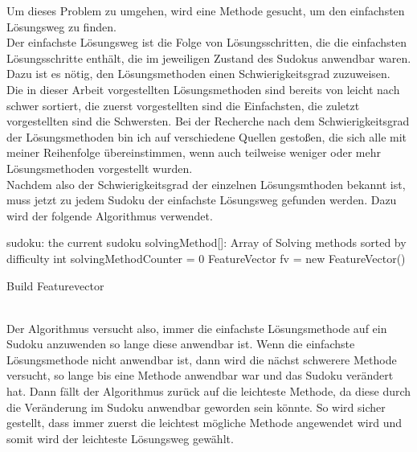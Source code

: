 Um dieses Problem zu umgehen, wird eine Methode gesucht, um den einfachsten Lösungsweg zu finden.\\
Der einfachste Lösungsweg ist die Folge von Lösungsschritten, die die einfachsten Lösungsschritte enthält, die im jeweiligen Zustand des Sudokus anwendbar waren. Dazu ist es nötig, den Lösungsmethoden einen Schwierigkeitsgrad zuzuweisen. \\
Die in dieser Arbeit vorgestellten Lösungsmethoden sind bereits von leicht nach schwer sortiert, die zuerst vorgestellten sind die Einfachsten, die zuletzt vorgestellten sind die Schwersten. Bei der Recherche nach dem Schwierigkeitsgrad der Lösungsmethoden bin ich auf verschiedene Quellen gestoßen, die sich alle mit meiner Reihenfolge übereinstimmen, wenn auch teilweise weniger oder mehr Lösungsmethoden vorgestellt wurden.\\
Nachdem also der Schwierigkeitsgrad der einzelnen Lösungsmthoden bekannt ist, muss jetzt zu jedem Sudoku der einfachste Lösungsweg gefunden werden. Dazu wird der folgende Algorithmus verwendet.\\

\begin{algorithm}[H]
 sudoku: the current sudoku\;
 solvingMethod[]: Array of Solving methods sorted by difficulty\;
 int solvingMethodCounter = 0\;
 FeatureVector fv = new FeatureVector()\;
 \caption{Build Featurevector}
\end{algorithm}
\mbox{} \\
Der Algorithmus versucht also, immer die einfachste Lösungsmethode auf ein Sudoku anzuwenden so lange diese anwendbar ist. Wenn die einfachste Lösungsmethode nicht anwendbar ist, dann wird die nächst schwerere Methode versucht, so lange bis eine Methode anwendbar war und das Sudoku verändert hat. Dann fällt der Algorithmus zurück auf die leichteste Methode, da diese durch die Veränderung im Sudoku anwendbar geworden sein könnte. So wird sicher gestellt, dass immer zuerst die leichtest mögliche Methode angewendet wird und somit wird der leichteste Lösungsweg gewählt.